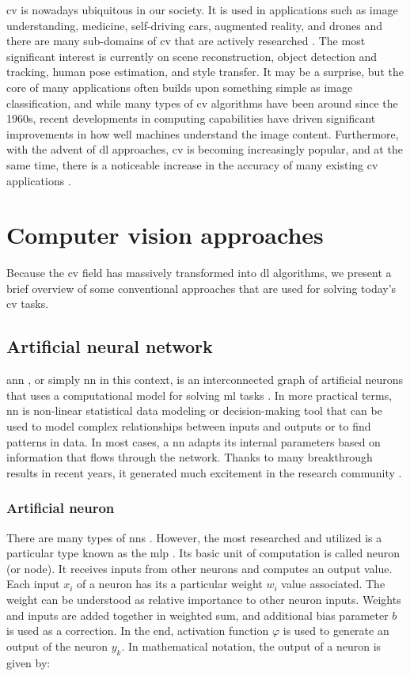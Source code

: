         \Gls{cv} is nowadays ubiquitous in our society. It is used in applications such as image understanding, medicine, self-driving cars, augmented reality, and drones and there are many sub-domains of \gls{cv} that are actively researched \cite{Szeliski:2010:CVA:1941882}. The most significant interest is currently on scene reconstruction, object detection and tracking, human pose estimation, and style transfer. It may be a surprise, but the core of many applications often builds upon something simple as image classification, and while many types of \gls{cv} algorithms have been around since the 1960s, recent developments in computing capabilities have driven significant improvements in how well machines understand the image content. Furthermore, with the advent of \gls{dl} approaches, \gls{cv} is becoming increasingly popular, and at the same time, there is a noticeable increase in the accuracy of many existing \gls{cv} applications \cite{goodfellow2016deep}. 
     
\section{Computer vision approaches}
    Because the \gls{cv} field has massively transformed into \gls{dl} algorithms, we present a brief overview of some conventional approaches that are used for solving today's \gls{cv} tasks.
    
    \subsection{Artificial neural network}
        \Gls{ann} \cite{goodfellow2016deep, zurada1992introduction}, or simply \gls{nn} in this context, is an interconnected graph of artificial neurons that uses a computational model for solving \gls{ml} tasks . In more practical terms, \gls{nn} is non-linear statistical data modeling or decision-making tool that can be used to model complex relationships between inputs and outputs or to find patterns in data. In most cases, a \gls{nn} adapts its internal parameters based on information that flows through the network. Thanks to many breakthrough results in recent years, it generated much excitement in the research community \cite{russakovsky2015imagenet}. 
        
        \subsubsection{Artificial neuron}
            There are many types of \gls{nn}s \cite{goodfellow2016deep}. However, the most researched and utilized is a particular type known as the \gls{mlp} \cite{rosenblatt1961principles}. Its basic unit of computation is called neuron (or node). It receives inputs from other neurons and computes an output value. Each input $x_i$ of a neuron has its a particular weight $w_i$ value associated. The weight can be understood as relative importance to other neuron inputs. Weights and inputs are added together in weighted sum, and additional bias parameter $b$ is used as a correction. In the end, activation function $\varphi$ is used to generate an output of the neuron $y_k$.  In mathematical notation, the output of a neuron is given by:
    
